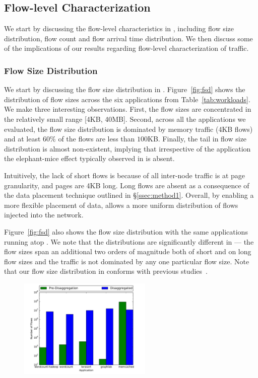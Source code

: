 \subsection{Flow-level Characterization} 
\label{ssec:flc}
We start by discussing the flow-level characteristics in \dis, including flow size distribution, flow count and flow arrival time distribution. We then discuss some of the implications of our results regarding flow-level characterization of \dis traffic.

\subsubsection{Flow Size Distribution}
We start by discussing the flow size distribution in \dis. Figure~\ref{fig:fsd} shows the distribution of flow sizes across the six applications from Table~\ref{tab:workloads}. We make three interesting observations. First, the flow sizes are concentrated in the relatively small range [4KB, 40MB]. Second, across all the applications we evaluated, the flow size distribution is dominated by memory traffic (4KB flows) and at least $60\%$ of the flows are less than $100$KB. Finally, the tail in flow size distribution is almost non-existent, implying that irrespective of the application the elephant-mice effect typically observed in \pdis is absent.

Intuitively, the lack of short flows is because of  all inter-node traffic is at page granularity, and pages are 4KB long. Long flows are absent as a consequence of the data placement technique outlined in \S\ref{ssec:method1}. Overall, by enabling a more flexible placement of data, \dis {} allows a more uniform distribution of flows injected into the network.

Figure~\ref{fig:fsd} also shows the flow size distribution with the same applications running atop \pdis. We note that the distributions are significantly different in \pdis --- the flow sizes span an additional two orders of magnitude both of short and on long flow sizes and the traffic is not dominated by any one particular flow size. Note that our flow size distribution in \pdis conforms with previous studies~\cite{imc-srikant, imc-theo}.

%
\begin{figure}
  \centering
    \includegraphics[width = 2.5in]{img/graph2_numflows} 
  \caption{\small{}}
  \label{fig:nof}
\end{figure}
%
%
